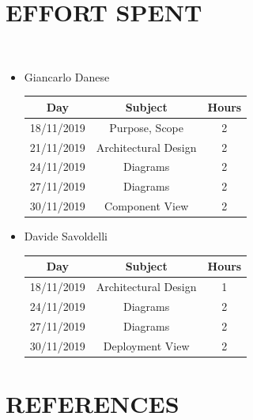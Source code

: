 \documentclass[12pt,a4paper]{article}
\begin{document}
\section{EFFORT SPENT}	\
\begin{itemize}
		\item Giancarlo Danese
		\begin{center}
			\begin{tabular}{| c | c | c |}
				\hline
				Day & Subject & Hours \\ \hline
				18/11/2019 & Purpose, Scope & 2 \\
				21/11/2019 & Architectural Design & 2\\
				24/11/2019 & Diagrams & 2\\
				27/11/2019 & Diagrams & 2\\
				30/11/2019 & Component View & 2\\
				\hline
			\end{tabular}
		\end{center}

		\item Davide Savoldelli
		\begin{center}
			\begin{tabular}{| c | c | c |}
				\hline
				Day & Subject & Hours \\ \hline
				18/11/2019 & Architectural Design & 1 \\
				24/11/2019 & Diagrams & 2 \\
				27/11/2019 & Diagrams & 2 \\
				30/11/2019 & Deployment View & 2\\
				\hline
			\end{tabular}
		\end{center}
	\end{itemize}
\section{REFERENCES}
\end{document}
